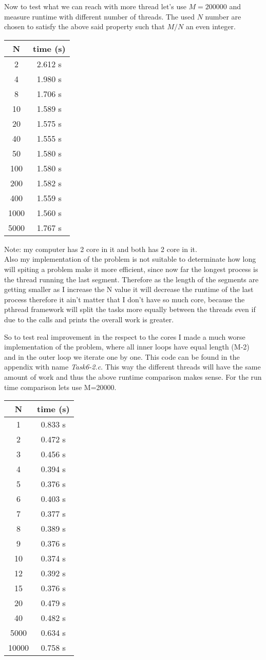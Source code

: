 Now to test what we can reach with more thread let's use $M=200000$ and measure runtime with different number of threads. The used $N$ number are chosen to satisfy the above said property such that $M/N$ an even integer.

\begin{tabular}{c | c}
N & time (s)\\ \hline
2 & 2.612 s\\
4 & 1.980 s\\
8 & 1.706 s \\
10 & 1.589 s\\ 
20 & 1.575 s\\
40 & 1.555 s\\
50 & 1.580 s\\
100 & 1.580 s\\
200 & 1.582 s\\
400 & 1.559 s\\
1000 & 1.560 s\\
5000 & 1.767 s
\end{tabular}

Note: my computer has 2 core in it and both has 2 core in it.\\ 
Also my implementation of the problem is not suitable to determinate how long will spiting a problem make it more efficient, since now far the longest process is the thread running the last segment. Therefore as the length of the segments are getting smaller as I increase the N value it will decrease the runtime of the last process therefore it ain't matter that I don't have so much core, because the pthread framework will split the tasks more equally between the threads even if due to the calls and prints the overall work is greater.

So to test real improvement in the respect to the cores I made a much worse implementation of the problem, where all inner loops have equal length (M-2) and in the outer loop we iterate one by one. This code can be found in the appendix with name \textit{Task6-2.c}. This way the different threads will have the same amount of work and thus the above runtime comparison makes sense. For the run time comparison lets use M=20000.

\begin{tabular}{c | c}
N & time (s)\\ \hline
1 & 0.833 s\\
2 & 0.472 s\\
3 & 0.456 s\\
4 & 0.394 s\\
5 & 0.376 s\\
6 & 0.403 s\\
7 & 0.377 s\\
8 & 0.389 s\\
9 & 0.376 s\\
10 & 0.374 s\\
12 & 0.392 s\\
15 & 0.376 s\\
20 & 0.479 s\\
40 & 0.482 s\\
5000 & 0.634 s\\
10000 & 0.758 s
\end{tabular}    

